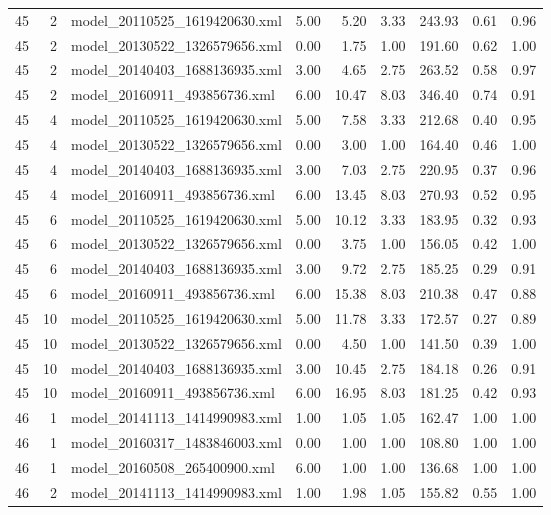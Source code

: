 \begin{table}[ht]
\begin{tabular}{rrlrrrrrr}
   45 &   2 & model\_20110525\_1619420630.xml & 5.00 & 5.20 & 3.33 & 243.93 & 0.61 & 0.96 \\ 
   45 &   2 & model\_20130522\_1326579656.xml & 0.00 & 1.75 & 1.00 & 191.60 & 0.62 & 1.00 \\ 
   45 &   2 & model\_20140403\_1688136935.xml & 3.00 & 4.65 & 2.75 & 263.52 & 0.58 & 0.97 \\ 
   45 &   2 & model\_20160911\_493856736.xml & 6.00 & 10.47 & 8.03 & 346.40 & 0.74 & 0.91 \\ 
   45 &   4 & model\_20110525\_1619420630.xml & 5.00 & 7.58 & 3.33 & 212.68 & 0.40 & 0.95 \\ 
   45 &   4 & model\_20130522\_1326579656.xml & 0.00 & 3.00 & 1.00 & 164.40 & 0.46 & 1.00 \\ 
   45 &   4 & model\_20140403\_1688136935.xml & 3.00 & 7.03 & 2.75 & 220.95 & 0.37 & 0.96 \\ 
   45 &   4 & model\_20160911\_493856736.xml & 6.00 & 13.45 & 8.03 & 270.93 & 0.52 & 0.95 \\ 
   45 &   6 & model\_20110525\_1619420630.xml & 5.00 & 10.12 & 3.33 & 183.95 & 0.32 & 0.93 \\ 
   45 &   6 & model\_20130522\_1326579656.xml & 0.00 & 3.75 & 1.00 & 156.05 & 0.42 & 1.00 \\ 
   45 &   6 & model\_20140403\_1688136935.xml & 3.00 & 9.72 & 2.75 & 185.25 & 0.29 & 0.91 \\ 
   45 &   6 & model\_20160911\_493856736.xml & 6.00 & 15.38 & 8.03 & 210.38 & 0.47 & 0.88 \\ 
   45 &  10 & model\_20110525\_1619420630.xml & 5.00 & 11.78 & 3.33 & 172.57 & 0.27 & 0.89 \\ 
   45 &  10 & model\_20130522\_1326579656.xml & 0.00 & 4.50 & 1.00 & 141.50 & 0.39 & 1.00 \\ 
   45 &  10 & model\_20140403\_1688136935.xml & 3.00 & 10.45 & 2.75 & 184.18 & 0.26 & 0.91 \\ 
   45 &  10 & model\_20160911\_493856736.xml & 6.00 & 16.95 & 8.03 & 181.25 & 0.42 & 0.93 \\ 
   46 &   1 & model\_20141113\_1414990983.xml & 1.00 & 1.05 & 1.05 & 162.47 & 1.00 & 1.00 \\ 
   46 &   1 & model\_20160317\_1483846003.xml & 0.00 & 1.00 & 1.00 & 108.80 & 1.00 & 1.00 \\ 
   46 &   1 & model\_20160508\_265400900.xml & 6.00 & 1.00 & 1.00 & 136.68 & 1.00 & 1.00 \\ 
   46 &   2 & model\_20141113\_1414990983.xml & 1.00 & 1.98 & 1.05 & 155.82 & 0.55 & 1.00 \\ 

\end{tabular}
\end{table}
